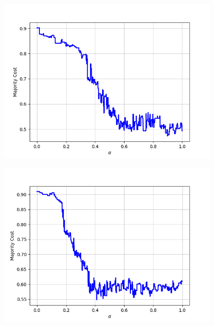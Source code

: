 \begin{figure}[H]
\begin{minipage}{.24\textwidth}
  {\includegraphics[width=\linewidth]{plots/omniglot-intra-sc-cnn/Cyrillic}}
\end{minipage}
\begin{minipage}{.24\textwidth}
  \centering
  {\includegraphics[width=\linewidth]{plots/omniglot-intra-sc-cnn/Early_Aramaic}}
\end{minipage}
\begin{minipage}{.24\textwidth}
  \centering

\end{minipage}
\end{figure}
